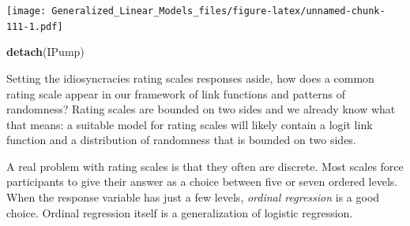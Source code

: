 \documentclass[]{svmono}
\newenvironment{Shaded}{\begin{snugshade}}{\end{snugshade}}
\newcommand{\KeywordTok}[1]{\textcolor[rgb]{0.13,0.29,0.53}{\textbf{#1}}}
\newcommand{\DataTypeTok}[1]{\textcolor[rgb]{0.13,0.29,0.53}{#1}}
\newcommand{\DecValTok}[1]{\textcolor[rgb]{0.00,0.00,0.81}{#1}}
\newcommand{\StringTok}[1]{\textcolor[rgb]{0.31,0.60,0.02}{#1}}
\newcommand{\OperatorTok}[1]{\textcolor[rgb]{0.81,0.36,0.00}{\textbf{#1}}}
\newcommand{\NormalTok}[1]{#1}
\theoremstyle{definition}
\theoremstyle{definition}
\theoremstyle{definition}
\theoremstyle{remark}
\begin{document}
\begin{Shaded}
\end{Shaded}

\texttt{[image: Generalized\_Linear\_Models\_files/figure-latex/unnamed-chunk-111-1.pdf]}

\begin{Shaded}
\begin{Highlighting}[]
\KeywordTok{detach}\NormalTok{(IPump)}
\end{Highlighting}
\end{Shaded}

Setting the idiosyncracies rating scales responses aside, how does a
common rating scale appear in our framework of link functions and
patterns of randomness? Rating scales are bounded on two sides and we
already know what that means: a suitable model for rating scales will
likely contain a logit link function and a distribution of randomness
that is bounded on two sides.

A real problem with rating scales is that they often are discrete. Most
scales force participants to give their answer as a choice between five
or seven ordered levels. When the response variable has just a few
levels, \emph{ordinal regression} is a good choice. Ordinal regression
itself is a generalization of logistic regression.
\end{document}
